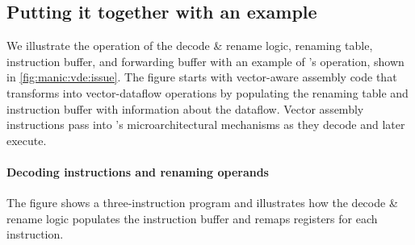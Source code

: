 \subsection{Putting it together with an example}
We illustrate the operation of the decode \& rename logic, renaming table, instruction
buffer, and forwarding buffer with an example of \manic's operation, shown in
\autoref{fig:manic:vde:issue}. 
%
The figure starts with vector-aware assembly code that \manic transforms into
vector-dataflow operations by populating the renaming table and instruction
buffer with information about the dataflow.
%
Vector assembly instructions pass into \manic's microarchitectural mechanisms
as they decode and later execute.
%

\figMANICMANICa

\paragraph{Decoding instructions and renaming operands}
The figure shows a three-instruction program and illustrates how
the decode \& rename logic populates the instruction buffer and remaps registers for each
instruction.

